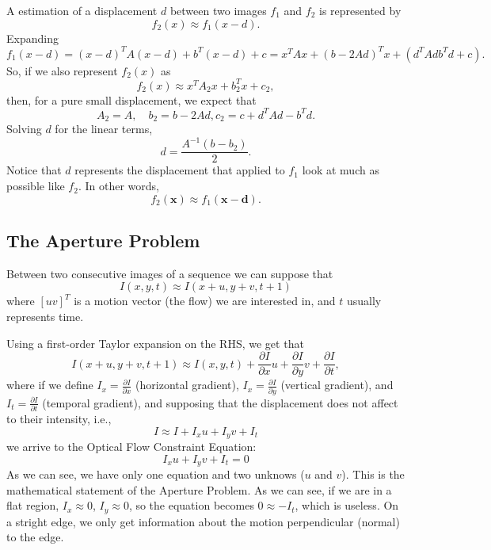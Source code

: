 A estimation of a displacement $d$ between two images $f_1$ and $f_2$ is represented by
\begin{equation}
  f_2(x) \approx f_1(x-d).
\end{equation}
Expanding
\begin{equation}
  f_1(x-d) = (x-d)^TA(x-d) + b^T(x-d) + c = x^TAx + (b-2Ad)^Tx + (d^TAdb^Td+c).
\end{equation}
So, if we also represent $f_2(x)$ as
\begin{equation}
  f_2(x) \approx x^TA_2x + b_2^Tx + c_2,
\end{equation}
then, for a pure small displacement, we expect that
\begin{equation}
  A_2 = A,\quad b_2 = b-2Ad, c_2=c + d^TAd-b^Td.
\end{equation}
Solving $d$ for the linear terms,
\begin{equation}
  d=\frac{A^{-1}(b-b_2)}{2}.
\end{equation}
Notice that $d$ represents the displacement that applied to $f_1$ look at much as possible like $f_2$. In other words,
\begin{equation}
  f_2(\mathbf{x}) \approx f_1(\mathbf{x} - \mathbf{d}).
\end{equation}

\subsection*{The Aperture Problem}
Between two consecutive images of a sequence we can suppose that
\begin{equation}
  I(x, y, t) \approx I(x+u, y+v, t+1)
\end{equation}
where $[u v]^T$ is a motion vector (the flow) we are interested in,
and $t$ usually represents time.

Using a first-order Taylor expansion on the RHS, we get that
\begin{equation}
  I(x+u, y+v, t+1) \approx I(x, y, t) + \frac{\partial I}{\partial x}u + \frac{\partial I}{\partial y}v + \frac{\partial I}{\partial t},
\end{equation}
where if we define $I_x = \frac{\partial I}{\partial x}$ (horizontal gradient), $I_x = \frac{\partial I}{\partial y}$ (vertical gradient), and $I_t = \frac{\partial I}{\partial t}$ (temporal gradient), and supposing that the displacement does not affect to their intensity, i.e.,
\begin{equation}
  I \approx I + I_xu + I_yv + I_t
\end{equation}
we arrive to the Optical Flow Constraint Equation:
\begin{equation}
  I_xu + I_yv + I_t = 0
\end{equation}
As we can see, we have only one equation and two unknows ($u$ and $v$). This is the mathematical statement of the Aperture Problem. As we can see, if we are in a flat region, $I_x\approx 0$, $I_y\approx 0$, so the equation becomes $0\approx -I_t$, which is useless. On a stright edge, we only get information about the motion perpendicular (normal) to the edge.

